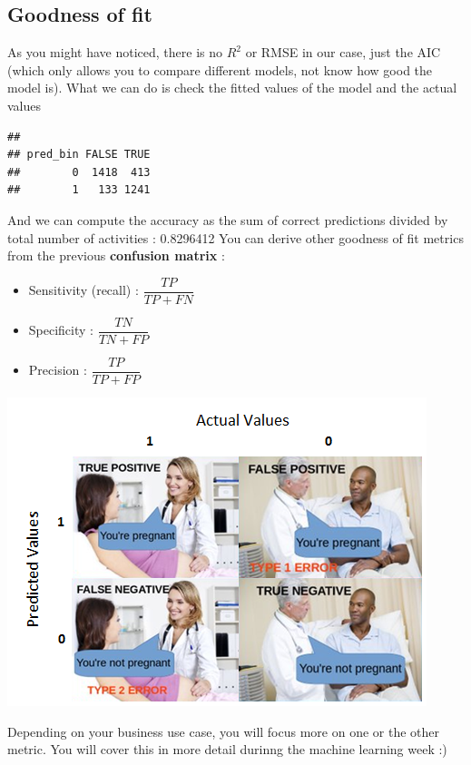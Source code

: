 \documentclass[
]{book}
\newenvironment{Shaded}{\begin{snugshade}}{\end{snugshade}}
\newcommand{\DataTypeTok}[1]{\textcolor[rgb]{0.13,0.29,0.53}{#1}}
\newcommand{\DecValTok}[1]{\textcolor[rgb]{0.00,0.00,0.81}{#1}}
\newcommand{\KeywordTok}[1]{\textcolor[rgb]{0.13,0.29,0.53}{\textbf{#1}}}
\newcommand{\NormalTok}[1]{#1}
\newcommand{\OperatorTok}[1]{\textcolor[rgb]{0.81,0.36,0.00}{\textbf{#1}}}
\newcommand{\StringTok}[1]{\textcolor[rgb]{0.31,0.60,0.02}{#1}}
\providecommand{\tightlist}{%
  \setlength{\itemsep}{0pt}\setlength{\parskip}{0pt}}
\begin{document}
\hypertarget{goodness-of-fit}{%
\subsection{Goodness of fit}\label{goodness-of-fit}}

As you might have noticed, there is no \(R^2\) or RMSE in our case, just the AIC (which only allows you to compare different models, not know how good the model is). What we can do is check the fitted values of the model and the actual values

\begin{Shaded}
\end{Shaded}

\begin{verbatim}
##         
## pred_bin FALSE TRUE
##        0  1418  413
##        1   133 1241
\end{verbatim}

And we can compute the accuracy as the sum of correct predictions divided by total number of activities : 0.8296412
You can derive other goodness of fit metrics from the previous \textbf{confusion matrix} :

\begin{itemize}
\tightlist
\item
  Sensitivity (recall) : \(\dfrac{TP}{TP+FN}\)
\item
  Specificity : \(\dfrac{TN}{TN+FP}\)
\item
  Precision : \(\dfrac{TP}{TP+FP}\)
\end{itemize}

\includegraphics{img/conf_matrix.png}

Depending on your business use case, you will focus more on one or the other metric. You will cover this in more detail durinng the machine learning week :)

  
\end{document}

